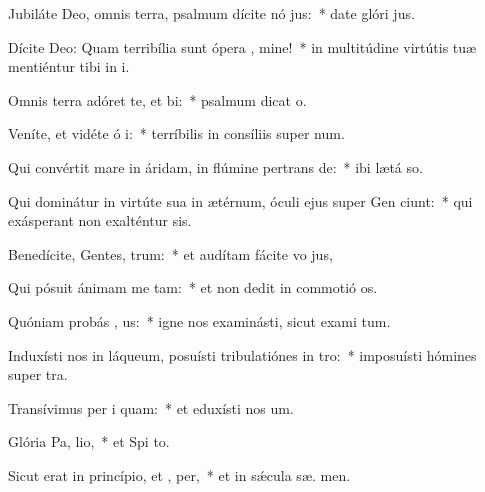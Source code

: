 \item Jubiláte Deo, omnis terra, psalmum dícite nó jus:~* date glóri  jus.
\item Dícite Deo: Quam terribília sunt ópera , mine!~* in multitúdine virtútis tuæ mentiéntur tibi in i.
\item Omnis terra adóret te, et  bi:~* psalmum dicat  o.
\item Veníte, et vidéte ó i:~* terríbilis in consíliis super  num.
\item Qui convértit mare in áridam, in flúmine pertrans de:~* ibi lætá  so.
\item Qui dominátur in virtúte sua in ætérnum, óculi ejus super Gen ciunt:~* qui exásperant non exalténtur  sis.
\item Benedícite, Gentes,  trum:~* et audítam fácite vo  jus,
\item Qui pósuit ánimam me  tam:~* et non dedit in commotió  os.
\item Quóniam probás , us:~* igne nos examinásti, sicut exami tum.
\item Induxísti nos in láqueum, posuísti tribulatiónes in  tro:~* imposuísti hómines super  tra.
\item Transívimus per i  quam:~* et eduxísti nos  um.
\item Glória Pa,  lio,~* et Spi to.
\item Sicut erat in princípio, et ,  per,~* et in sǽcula sæ. men.
